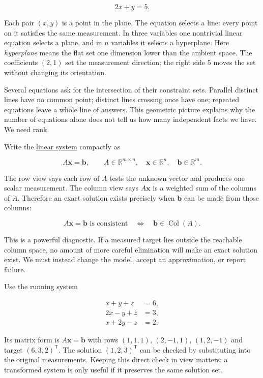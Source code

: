 \[
2x+y=5.
\]

Each pair \((x,y)\) is a point in the plane. The equation selects a line: every point on it satisfies the same measurement. In three variables one nontrivial linear equation selects a plane, and in \(n\) variables it selects a hyperplane. Here \emph{hyperplane} means the flat set one dimension lower than the ambient space. The coefficients \((2,1)\) set the measurement direction; the right side \(5\) moves the set without changing its orientation.

Several equations ask for the intersection of their constraint sets. Parallel distinct lines have no common point; distinct lines crossing once have one; repeated equations leave a whole line of answers. This geometric picture explains why the number of equations alone does not tell us how many independent facts we have. We need rank.

Write the \hyperref[01-foundations-i-ch019-a-system-is-an-intersection-of-constraints]{linear system} compactly as

\[
A\mathbf x=\mathbf b,
\qquad A\in\mathbb R^{m\times n},\quad
\mathbf x\in\mathbb R^n,\quad\mathbf b\in\mathbb R^m.
\]

The row view says each row of \(A\) tests the unknown vector and produces one scalar measurement. The column view says \(A\mathbf x\) is a weighted sum of the columns of \(A\). Therefore an exact solution exists precisely when \(\mathbf b\) can be made from those columns:

\[
A\mathbf x=\mathbf b\text{ is consistent}
\quad\Longleftrightarrow\quad
\mathbf b\in\operatorname{Col}(A).
\]

This is a powerful diagnostic. If a measured target lies outside the reachable column space, no amount of more careful elimination will make an exact solution exist. We must instead change the model, accept an approximation, or report failure.

Use the running system

\[
\begin{aligned}
x+y+z&=6,\\
2x-y+z&=3,\\
x+2y-z&=2.
\end{aligned}
\]

Its matrix form is \(A\mathbf x=\mathbf b\) with rows \((1,1,1)\), \((2,-1,1)\), \((1,2,-1)\) and target \((6,3,2)^\mathsf T\). The solution \((1,2,3)^\mathsf T\) can be checked by substituting into the original measurements. Keeping this direct check in view matters: a transformed system is only useful if it preserves the same solution set.

